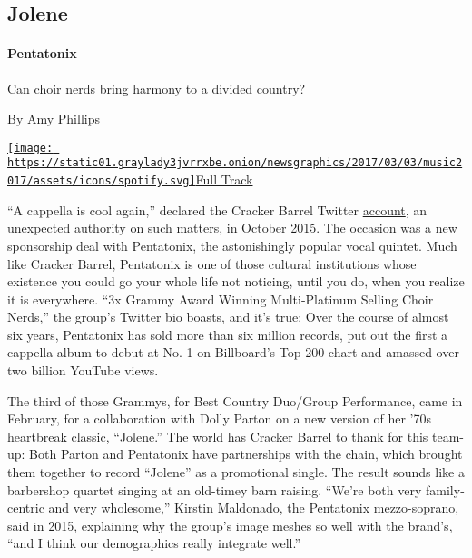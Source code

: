 \hypertarget{--jolene}{%
\subsection{\texorpdfstring{ Jolene}{  Jolene}}\label{--jolene}}

\hypertarget{pentatonix}{%
\paragraph{Pentatonix}\label{pentatonix}}

Can choir nerds bring harmony to a divided country?

By Amy Phillips

\href{https://open.spotify.com/track/60PbWX0IWXg10YaE6VlywH}{\texttt{[image: https://static01.graylady3jvrrxbe.onion/newsgraphics/2017/03/03/music2017/assets/icons/spotify.svg]}Full
Track}

``A cappella is cool again,'' declared the Cracker Barrel Twitter
\href{https://twitter.com/crackerbarrel/status/659404256785616896}{account},
an unexpected authority on such matters, in October 2015. The occasion
was a new sponsorship deal with Pentatonix, the astonishingly popular
vocal quintet. Much like Cracker Barrel, Pentatonix is one of those
cultural institutions whose existence you could go your whole life not
noticing, until you do, when you realize it is everywhere. ``3x Grammy
Award Winning Multi-Platinum Selling Choir Nerds,'' the group's Twitter
bio boasts, and it's true: Over the course of almost six years,
Pentatonix has sold more than six million records, put out the first a
cappella album to debut at No. 1 on Billboard's Top 200 chart and
amassed over two billion YouTube views.

The third of those Grammys, for Best Country Duo/Group Performance, came
in February, for a collaboration with Dolly Parton on a new version of
her '70s heartbreak classic, ``Jolene.'' The world has Cracker Barrel to
thank for this team-up: Both Parton and Pentatonix have partnerships
with the chain, which brought them together to record ``Jolene'' as a
promotional single. The result sounds like a barbershop quartet singing
at an old-timey barn raising. ``We're both very family-centric and very
wholesome,'' Kirstin Maldonado, the Pentatonix mezzo-soprano, said in
2015, explaining why the group's image meshes so well with the brand's,
``and I think our demographics really integrate well.''

